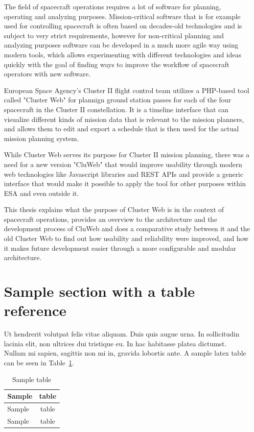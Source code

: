 The field of spacecraft operations requires a lot of software for planning, operating and analyzing purposes. Mission-critical software that is for example used for controlling spacecraft is often based on decades-old technologies and is subject to very strict requirements, however for non-critical planning and analyzing purposes software can be developed in a much more agile way using modern tools, which allows experimenting with different technologies and ideas quickly with the goal of finding ways to improve the workflow of spacecraft operators with new software.

European Space Agency's Cluster II flight control team utilizes a PHP-based tool called "Cluster Web" for plannign ground station passes for each of the four spacecraft in the Cluster II constellation. It is a timeline interface that can visualize different kinds of mission data that is relevant to the mission planners, and allows them to edit and export a schedule that is then used for the actual mission planning system.

While Cluster Web serves its purpose for Cluster II mission planning, there was a need for a new version "CluWeb" that would improve usability through modern web technologies like Javascript libraries and REST APIs and provide a generic interface that would make it possible to apply the tool for other purposes within ESA and even outside it.

This thesis explains what the purpose of Cluster Web is in the context of spacecraft operations, provides an overview to the architecture and the development process of CluWeb and does a comparative study between it and the old Cluster Web to find out how usability and reliability were improved, and how it makes future development easier through a more configurable and modular architecture. \cite{kamara, al-shaer}


\section{Sample section with a table reference}

Ut hendrerit volutpat felis vitae aliquam. Duis quis augue urna. In sollicitudin lacinia elit, 
non ultrices dui tristique eu. In hac habitasse platea dictumst. Nullam mi sapien, sagittis non 
mi in, gravida lobortis ante. A sample latex table can be seen in Table~\ref{tab:sample_table}.


\begin{table}[!ht]
\def\arraystretch{1.1}%
\begin{center}
  \caption{Sample table}
  \label{tab:sample_table}
  \begin{tabular}{| l | c | }
    \hline
    Sample & table \\
    \hline
    Sample & table \\
    Sample & table \\
    \hline
  \end{tabular}

  \end{center}
\end{table}

